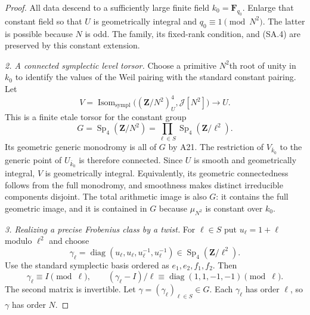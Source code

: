 \documentclass[11pt,a4paper]{article}
\begin{document}
\begin{proof}
All data descend to a sufficiently large finite field
$k_0=\mathbf F_{q_0}$.  Enlarge that constant field so
that $U$ is geometrically integral and
$q_0\equiv1\pmod{N^2}$.  The latter is possible because
$N$ is odd.  The family, its fixed-rank condition,
and (SA.4) are preserved by this constant extension.

\emph{2. A connected symplectic level torsor.}
Choose a primitive $N^2$th root of unity in $k_0$ to
identify the values of the Weil pairing with the standard
constant pairing.  Let
\[
 V=\operatorname{Isom}_{\mathrm{sympl}}
       \bigl((\mathbf Z/N^2)^4_U,\mathcal J[N^2]\bigr)
                      \longrightarrow U.                    \tag{SA.5}
\]
This is a finite etale torsor for the constant group
\[
       G=\operatorname{Sp}_4(\mathbf Z/N^2)
        =\prod_{\ell\in S}
                       \operatorname{Sp}_4(\mathbf Z/\ell^2).
\]
Its geometric generic monodromy is all of $G$ by A21.
The restriction of $V_{\overline{k}_0}$ to the generic
point of $U_{\overline{k}_0}$ is therefore connected.
Since $U$ is smooth and
geometrically integral, $V$ is geometrically integral.
Equivalently, its geometric connectedness follows from
the full monodromy, and smoothness makes distinct
irreducible components disjoint.
The total arithmetic image is also $G$: it contains
the full geometric image, and it is contained in $G$
because $\mu_{N^2}$ is constant over $k_0$.

\emph{3. Realizing a precise Frobenius class by a twist.}
For $\ell\in S$ put $u_\ell=1+\ell$ modulo $\ell^2$ and
choose
\[
 \gamma_\ell=
 \operatorname{diag}(u_\ell,u_\ell,
                         u_\ell^{-1},u_\ell^{-1})
     \in\operatorname{Sp}_4(\mathbf Z/\ell^2).
                                                               \tag{SA.6}
\]
Use the standard symplectic basis ordered as
$e_1,e_2,f_1,f_2$.  Then
\[
 \gamma_\ell\equiv I\pmod\ell,\qquad
 (\gamma_\ell-I)/\ell
                   \equiv\operatorname{diag}(1,1,-1,-1)
                             \pmod\ell.                       \tag{SA.7}
\]
The second matrix is invertible.
Let $\gamma=(\gamma_\ell)_{\ell\in S}\in G$.
Each $\gamma_\ell$ has order $\ell$, so $\gamma$ has
order $N$.


\end{proof}
\end{document}
